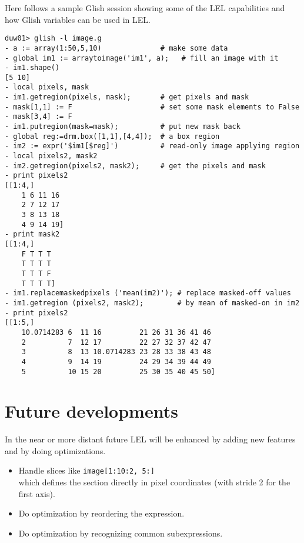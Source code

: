 Here follows a sample Glish session showing some of the LEL
capabilities and how Glish variables can be used in LEL.
\begin{verbatim}
duw01> glish -l image.g
- a := array(1:50,5,10)              # make some data
- global im1 := arraytoimage('im1', a);   # fill an image with it
- im1.shape()
[5 10]
- local pixels, mask
- im1.getregion(pixels, mask);       # get pixels and mask
- mask[1,1] := F                     # set some mask elements to False
- mask[3,4] := F
- im1.putregion(mask=mask);          # put new mask back
- global reg:=drm.box([1,1],[4,4]);  # a box region
- im2 := expr('$im1[$reg]')          # read-only image applying region
- local pixels2, mask2
- im2.getregion(pixels2, mask2);     # get the pixels and mask
- print pixels2
[[1:4,]
    1 6 11 16
    2 7 12 17
    3 8 13 18
    4 9 14 19] 
- print mask2
[[1:4,]
    F T T T
    T T T T
    T T T F
    T T T T] 
- im1.replacemaskedpixels ('mean(im2)'); # replace masked-off values
- im1.getregion (pixels2, mask2);        # by mean of masked-on in im2
- print pixels2
[[1:5,]
    10.0714283 6  11 16         21 26 31 36 41 46
    2          7  12 17         22 27 32 37 42 47
    3          8  13 10.0714283 23 28 33 38 43 48
    4          9  14 19         24 29 34 39 44 49
    5          10 15 20         25 30 35 40 45 50]
\end{verbatim}

\section{Future developments}
In the near or more distant future LEL will be enhanced by adding new
features and by doing optimizations.
\begin{itemize}
  \item Handle slices like \texttt{image[1:10:2, 5:]}
        \\which defines the section directly in pixel coordinates (with
        stride 2 for the first axis).
  \item Do optimization by reordering the expression.
  \item Do optimization by recognizing common subexpressions.
\end{itemize}
